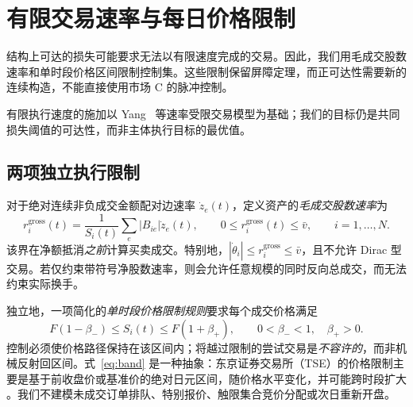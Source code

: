 \documentclass[11pt]{article}
\numberwithin{equation}{section}
\theoremstyle{definition}
\theoremstyle{remark}
\begin{document}
\section{有限交易速率与每日价格限制}\label{sec:rateband}
结构上可达的损失可能要求无法以有限速度完成的交易。因此，我们用毛成交股数速率和单时段价格区间限制控制集。这些限制保留屏障定理，而正可达性需要新的连续构造，不能直接使用市场 C 的脉冲控制。

有限执行速度的施加以 Yang~\citep{Yang2019} 等速率受限交易模型为基础；我们的目标仍是共同损失阈值的可达性，而非主体执行目标的最优值。

\subsection{两项独立执行限制}
对于绝对连续非负成交金额配对边速率 $\dot z_e(t)$，定义资产的\emph{毛成交股数速率}为
\begin{equation}\label{eq:grossrate}
 r_i^{\mathrm{gross}}(t)=\frac{1}{S_i(t)}\sum_e |B_{ie}|\dot z_e(t),\qquad
 0\le r_i^{\mathrm{gross}}(t)\le\bar v,\qquad i=1,\ldots,N.
\end{equation}
该界在净额抵消\emph{之前}计算买卖成交。特别地，$|\dot\theta_i|\le r_i^{\mathrm{gross}}\le\bar v$，且不允许 Dirac 型交易。若仅约束带符号净股数速率，则会允许任意规模的同时反向总成交，而无法约束实际换手。

独立地，一项简化的\emph{单时段价格限制规则}要求每个成交价格满足
\begin{equation}\label{eq:band}
 F(1-\beta_-)\le S_i(t)\le F(1+\beta_+),\qquad
 0<\beta_-<1,\quad\beta_+>0.
\end{equation}
控制必须使价格路径保持在该区间内；将越过限制的尝试交易是\emph{不容许的}，而非机械反射回区间。式~\eqref{eq:band} 是一种抽象：东京证券交易所（TSE）的价格限制主要是基于前收盘价或基准价的绝对日元区间，随价格水平变化，并可能跨时段扩大 \citep{JPX2026}。我们不建模未成交订单排队、特别报价、触限集合竞价分配或次日重新开盘。
\end{document}
